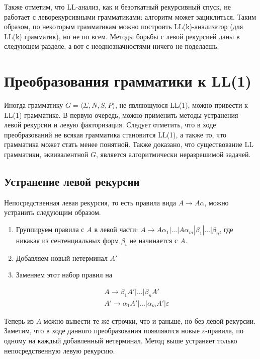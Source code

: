 \documentclass[10pt]{article}         %
\begin{document}
	Также отметим, что LL-анализ, как и безоткатный рекурсивный спуск, не работает с леворекурсивными грамматиками: алгоритм может зациклиться. Таким образом, по некоторым грамматикам можно построить LL(k)-анализатор (для LL(k) грамматик), но не по всем. Методы борьбы с левой рекурсией даны в следующем разделе, а вот с неоднозначностями ничего не поделаешь.
	
	\section{Преобразования грамматики к LL(1)}
	
	Иногда грамматику $G = \langle \Sigma, N, S, P \rangle$, не являющуюся LL(1), можно привести к LL(1) грамматике. В первую очередь, можно применить методы устранения левой рекурсии и левую факторизация. Следует отметить, что в ходе преобразований не всякая грамматика становится LL(1), а также то, что грамматика может стать менее понятной. Также доказано, что существование LL грамматики, эквивалентной $G$, является алгоритмически неразрешимой задачей. 
	
	\subsection{Устранение левой рекурсии}
	Непосредственная левая рекурсия, то есть правила вида $A \to A\alpha$, можно устранить следующим образом.
	
	\begin{enumerate}
		\item Группируем правила с $A$ в левой части:
		$A \to A\alpha_1|\dots|A\alpha_m|\beta_1|\dots|\beta_n$, где никакая из сентенциальных форм $\beta_i$ не начинается с $A$.
		\item Добавляем новый нетерминал $A'$
		\item Заменяем этот набор правил на
		
		\begin{align*} 
			A \to \beta_1 A'|\dots|\beta_n A' \\
			A' \to \alpha_1 A'|\dots|\alpha_m A'|\varepsilon
		\end{align*}
	\end{enumerate} 
	
	Теперь из $A$ можно вывести те же строчки, что и раньше, но без левой рекурсии. Заметим, что в ходе данного преобразования появляются новые $\varepsilon$-правила, по одному на каждый добавленный нетерминал.
	Метод выше устраняет только непосредственную левую рекурсию.
	
\end{document}
